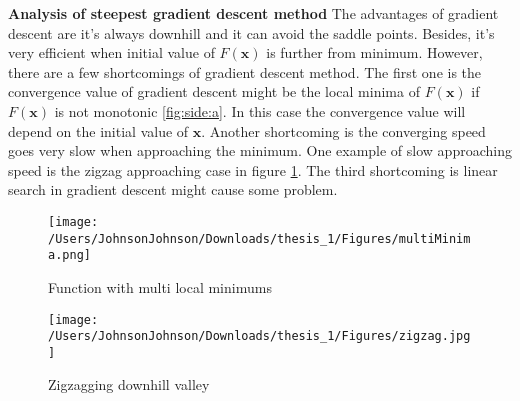 \textbf{Analysis of steepest gradient descent method} The advantages of gradient descent are it's always downhill and it can avoid the saddle points. Besides, it's very efficient when initial value of $F(\bm{x})$ is further from minimum. However, there are a few shortcomings of gradient descent method. The first one is the convergence value of gradient descent might be the local minima of $F(\bm{x})$ if $F(\bm{x})$ is not monotonic \ref{fig:side:a}. In this case the convergence value will depend on the initial value of $\bm{x}$. Another shortcoming is the converging speed goes very slow when approaching the minimum. One example of slow approaching speed is the zigzag approaching case in figure \ref{fig:side:b}. The third shortcoming is linear search in gradient descent might cause some problem.
\begin{figure}[H]
\begin{minipage}[t]{0.5\linewidth}
\centering
\texttt{[image: /Users/JohnsonJohnson/Downloads/thesis\_1/Figures/multiMinima.png]}
\caption{Function with multi local minimums}
\label{fig:side:a}
\end{minipage}%
\begin{minipage}[t]{0.5\linewidth}
\centering
\texttt{[image: /Users/JohnsonJohnson/Downloads/thesis\_1/Figures/zigzag.jpg]}
\caption{Zigzagging downhill valley}
\label{fig:side:b}
\end{minipage}
\end{figure}

